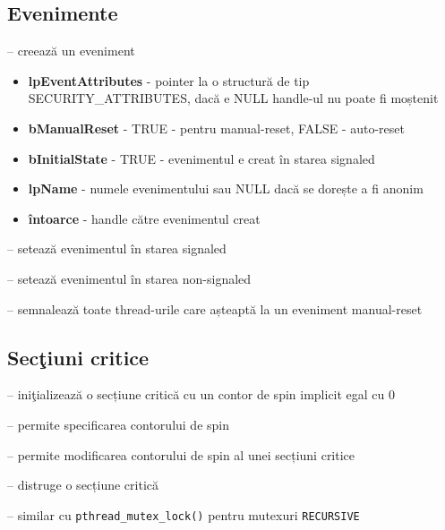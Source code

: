 \documentclass{refcard.cs.pub.ro}
\begin{document}
\begin{multicols*}{3}
\subsection{Evenimente}
 -- creează un eveniment
\begin{itemize}
  \item \textbf{lpEventAttributes} - pointer la o structură de tip SECURITY_ATTRIBUTES, dacă e NULL handle-ul nu poate fi moștenit
  \item \textbf{bManualReset} - TRUE - pentru manual-reset, FALSE - auto-reset
  \item \textbf{bInitialState} - TRUE - evenimentul e creat în starea signaled
  \item \textbf{lpName} - numele evenimentului sau NULL dacă se dorește a fi anonim
  \item \textbf{întoarce} - handle către evenimentul creat
\end{itemize}

 -- setează evenimentul în starea signaled

 -- setează evenimentul în starea non-signaled

 -- semnalează toate thread-urile care așteaptă la un eveniment manual-reset


\subsection{Secţiuni critice}
 
 -- iniţializează o secțiune critică cu un contor de spin implicit egal cu 0
 
 -- permite specificarea contorului de spin
 
 -- permite modificarea contorului de spin al unei secțiuni critice
 
 -- distruge o secțiune critică

 -- similar cu \texttt{pthread_mutex_lock()} pentru mutexuri \texttt{RECURSIVE}


\end{multicols*}
\end{document}
